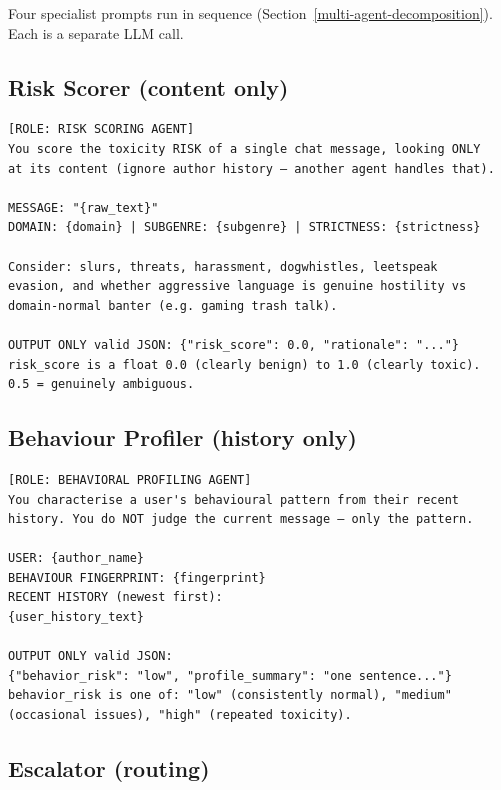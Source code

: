 Four specialist prompts run in sequence (Section~\ref{multi-agent-decomposition}). Each is a separate LLM call.

\subsection{Risk Scorer (content only)}\label{risk-scorer-content-only}

\begin{verbatim}
[ROLE: RISK SCORING AGENT]
You score the toxicity RISK of a single chat message, looking ONLY 
at its content (ignore author history — another agent handles that).

MESSAGE: "{raw_text}"
DOMAIN: {domain} | SUBGENRE: {subgenre} | STRICTNESS: {strictness}

Consider: slurs, threats, harassment, dogwhistles, leetspeak 
evasion, and whether aggressive language is genuine hostility vs 
domain-normal banter (e.g. gaming trash talk).

OUTPUT ONLY valid JSON: {"risk_score": 0.0, "rationale": "..."}
risk_score is a float 0.0 (clearly benign) to 1.0 (clearly toxic). 
0.5 = genuinely ambiguous.
\end{verbatim}

\subsection{Behaviour Profiler (history only)}\label{behavior-profiler-history-only}

\begin{verbatim}
[ROLE: BEHAVIORAL PROFILING AGENT]
You characterise a user's behavioural pattern from their recent 
history. You do NOT judge the current message — only the pattern.

USER: {author_name}
BEHAVIOUR FINGERPRINT: {fingerprint}
RECENT HISTORY (newest first):
{user_history_text}

OUTPUT ONLY valid JSON:
{"behavior_risk": "low", "profile_summary": "one sentence..."}
behavior_risk is one of: "low" (consistently normal), "medium" 
(occasional issues), "high" (repeated toxicity).
\end{verbatim}

\subsection{Escalator (routing)}\label{escalator-routing}

